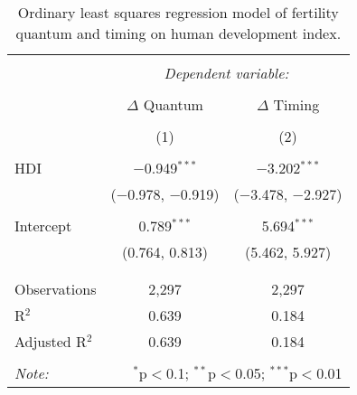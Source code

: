 
\begin{table}[!htbp] \centering 
  \caption{Ordinary least squares regression model of fertility quantum and timing on human development index.} 
  \label{mod: hdi} 
\begin{tabular}{@{\extracolsep{5pt}}lcc} 
\\[-1.8ex]\hline 
\hline \\[-1.8ex] 
 & \multicolumn{2}{c}{\textit{Dependent variable:}} \\ 
\cline{2-3} 
\\[-1.8ex] & $\Delta$ Quantum & $\Delta$ Timing \\ 
\\[-1.8ex] & (1) & (2)\\ 
\hline \\[-1.8ex] 
 HDI & $-$0.949$^{***}$ & $-$3.202$^{***}$ \\ 
  & ($-$0.978, $-$0.919) & ($-$3.478, $-$2.927) \\ 
  & & \\ 
 Intercept & 0.789$^{***}$ & 5.694$^{***}$ \\ 
  & (0.764, 0.813) & (5.462, 5.927) \\ 
  & & \\ 
\hline \\[-1.8ex] 
Observations & 2,297 & 2,297 \\ 
R$^{2}$ & 0.639 & 0.184 \\ 
Adjusted R$^{2}$ & 0.639 & 0.184 \\ 
\hline 
\hline \\[-1.8ex] 
\textit{Note:}  & \multicolumn{2}{r}{$^{*}$p$<$0.1; $^{**}$p$<$0.05; $^{***}$p$<$0.01} \\ 
\end{tabular} 
\end{table} 
